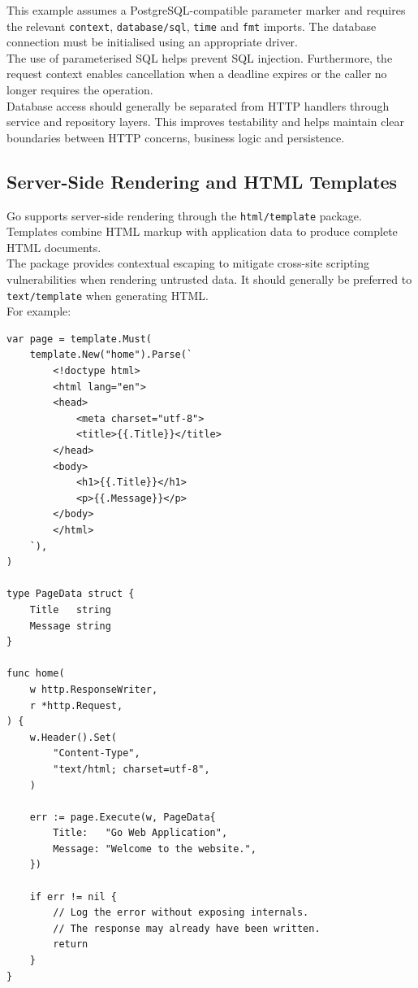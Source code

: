 This example assumes a PostgreSQL-compatible parameter marker and requires the relevant \texttt{context}, \texttt{database/sql}, \texttt{time} and \texttt{fmt} imports. The database connection must be initialised using an appropriate driver.\\

The use of parameterised SQL helps prevent SQL injection. Furthermore, the request context enables cancellation when a deadline expires or the caller no longer requires the operation.\\

Database access should generally be separated from HTTP handlers through service and repository layers. This improves testability and helps maintain clear boundaries between HTTP concerns, business logic and persistence.\\

\subsection{Server-Side Rendering and HTML Templates}

Go supports server-side rendering through the \texttt{html/template} package. Templates combine HTML markup with application data to produce complete HTML documents.\\

The package provides contextual escaping to mitigate cross-site scripting vulnerabilities when rendering untrusted data. It should generally be preferred to \texttt{text/template} when generating HTML.\\

For example:

\begin{lstlisting}
var page = template.Must(
    template.New("home").Parse(`
        <!doctype html>
        <html lang="en">
        <head>
            <meta charset="utf-8">
            <title>{{.Title}}</title>
        </head>
        <body>
            <h1>{{.Title}}</h1>
            <p>{{.Message}}</p>
        </body>
        </html>
    `),
)

type PageData struct {
    Title   string
    Message string
}

func home(
    w http.ResponseWriter,
    r *http.Request,
) {
    w.Header().Set(
        "Content-Type",
        "text/html; charset=utf-8",
    )

    err := page.Execute(w, PageData{
        Title:   "Go Web Application",
        Message: "Welcome to the website.",
    })

    if err != nil {
        // Log the error without exposing internals.
        // The response may already have been written.
        return
    }
}
\end{lstlisting}

